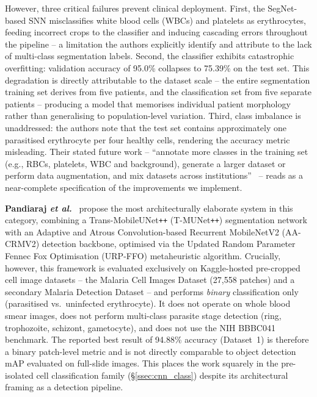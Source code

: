 \documentclass[10pt,twocolumn]{article}
\newcommand{\etal}{\textit{et al.}}
\begin{document}
However, three critical failures prevent clinical deployment. First,
the SegNet-based SNN misclassifies white blood cells (WBCs) and platelets
as erythrocytes, feeding incorrect crops to the classifier and inducing
cascading errors throughout the pipeline -- a limitation the authors
explicitly identify and attribute to the lack of multi-class segmentation
labels. Second, the classifier exhibits catastrophic overfitting: validation
accuracy of 95.0\% collapses to 75.39\% on the test set. This degradation
is directly attributable to the dataset scale -- the entire segmentation
training set derives from five patients, and the classification set from
five separate patients -- producing a model that memorises individual patient
morphology rather than generalising to population-level variation. Third,
class imbalance is unaddressed: the authors note that the test set contains
approximately one parasitised erythrocyte per four healthy cells, rendering
the accuracy metric misleading. Their stated future work -- ``annotate more
classes in the training set (e.g., RBCs, platelets, WBC and background),
generate a larger dataset or perform data augmentation, and mix datasets
across institutions''~\cite{delgado2020} -- reads as a near-complete
specification of the improvements we implement.

\textbf{Pandiaraj \etal}~\cite{pandiaraj2024} propose the most
architecturally elaborate system in this category, combining a
Trans-MobileUNet\texttt{++} (T-MUNet\texttt{++}) segmentation network
with an Adaptive and Atrous Convolution-based Recurrent MobileNetV2
(AA-CRMV2) detection backbone, optimised via the Updated Random
Parameter Fennec Fox Optimisation (URP-FFO) metaheuristic algorithm.
Crucially, however, this framework is evaluated exclusively on
Kaggle-hosted pre-cropped cell image datasets -- the Malaria Cell
Images Dataset (27{,}558 patches) and a secondary Malaria Detection
Dataset -- and performs \emph{binary} classification only (parasitised
vs.\ uninfected erythrocyte). It does not operate on whole blood smear
images, does not perform multi-class parasite stage detection (ring,
trophozoite, schizont, gametocyte), and does not use the NIH BBBC041
benchmark. The reported best result of 94.88\% accuracy (Dataset~1)
is therefore a binary patch-level metric and is not directly comparable
to object detection mAP evaluated on full-slide images. This places
the work squarely in the pre-isolated cell classification family
(\S\ref{ssec:cnn_class}) despite its architectural framing as a
detection pipeline.
\end{document}
